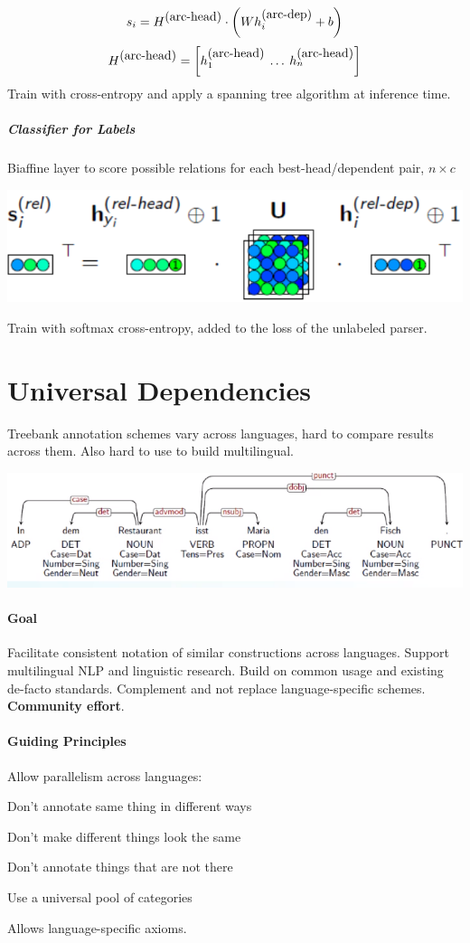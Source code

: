 \documentclass[10pt]{report}
\begin{document}
$$s_i = H^{\hbox{(arc-head)}}\cdot\left(Wh_i^{\hbox{(arc-dep)}}+b\right)$$
$$H^{\hbox{(arc-head)}} = \left[h_1^{\hbox{(arc-head)}}\:\ldots\:h_n^{\hbox{(arc-head)}}\right]$$
Train with cross-entropy and apply a spanning tree algorithm at inference time.
\subparagraph{Classifier for Labels} Biaffine layer to score possible relations for each best-head/dependent pair, $n\times c$
\begin{center}
	\includegraphics[scale=0.5]{48.png}
\end{center}
Train with softmax cross-entropy, added to the loss of the unlabeled parser.
\section{Universal Dependencies}
Treebank annotation schemes vary across languages, hard to compare results across them. Also hard to use to build multilingual.
\begin{center}
	\includegraphics[scale=0.5]{39.png}
\end{center}
\paragraph{Goal} Facilitate consistent notation of similar constructions across languages. Support multilingual NLP and linguistic research. Build on common usage and existing de-facto standards. Complement and not replace language-specific schemes. \textbf{Community effort}.
\paragraph{Guiding Principles} Allow parallelism across languages:
\begin{list}{}{}
	\item Don't annotate same thing in different ways
	\item Don't make different things look the same
	\item Don't annotate things that are not there
	\item Use a universal pool of categories
\end{list}
Allows language-specific axioms.
\end{document}
